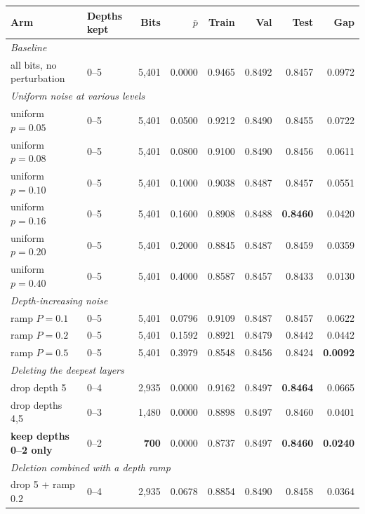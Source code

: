 \documentclass[11pt,a4paper]{article}
\begin{document}
\begin{table}[h]\centering\footnotesize
\begin{tabular}{llrrrrrr}
\toprule
\textbf{Arm} & \textbf{Depths kept} & \textbf{Bits} & $\bar p$ &
\textbf{Train} & \textbf{Val} & \textbf{Test} & \textbf{Gap}\\
\midrule
\multicolumn{8}{l}{\textit{Baseline}}\\
all bits, no perturbation & 0--5 & 5{,}401 & 0.0000 & 0.9465 & 0.8492 & 0.8457 & 0.0972\\
\midrule
\multicolumn{8}{l}{\textit{Uniform noise at various levels}}\\
uniform $p=0.05$ & 0--5 & 5{,}401 & 0.0500 & 0.9212 & 0.8490 & 0.8455 & 0.0722\\
uniform $p=0.08$ & 0--5 & 5{,}401 & 0.0800 & 0.9100 & 0.8490 & 0.8456 & 0.0611\\
uniform $p=0.10$ & 0--5 & 5{,}401 & 0.1000 & 0.9038 & 0.8487 & 0.8457 & 0.0551\\
uniform $p=0.16$ & 0--5 & 5{,}401 & 0.1600 & 0.8908 & 0.8488 & \textbf{0.8460} & 0.0420\\
uniform $p=0.20$ & 0--5 & 5{,}401 & 0.2000 & 0.8845 & 0.8487 & 0.8459 & 0.0359\\
uniform $p=0.40$ & 0--5 & 5{,}401 & 0.4000 & 0.8587 & 0.8457 & \textcolor{bad}{0.8433} & 0.0130\\
\midrule
\multicolumn{8}{l}{\textit{Depth-increasing noise}}\\
ramp $P=0.1$ & 0--5 & 5{,}401 & 0.0796 & 0.9109 & 0.8487 & 0.8457 & 0.0622\\
ramp $P=0.2$ & 0--5 & 5{,}401 & 0.1592 & 0.8921 & 0.8479 & \textcolor{bad}{0.8442} & 0.0442\\
ramp $P=0.5$ & 0--5 & 5{,}401 & 0.3979 & 0.8548 & 0.8456 & \textcolor{bad}{0.8424} & \textbf{0.0092}\\
\midrule
\multicolumn{8}{l}{\textit{Deleting the deepest layers}}\\
drop depth 5 & 0--4 & 2{,}935 & 0.0000 & 0.9162 & 0.8497 & \textbf{0.8464} & 0.0665\\
drop depths 4,5 & 0--3 & 1{,}480 & 0.0000 & 0.8898 & 0.8497 & 0.8460 & 0.0401\\
\textbf{keep depths 0--2 only} & 0--2 & \textbf{700} & 0.0000 & 0.8737 & 0.8497 & \textbf{0.8460} & \textbf{0.0240}\\
\midrule
\multicolumn{8}{l}{\textit{Deletion combined with a depth ramp}}\\
drop 5 + ramp $0.2$ & 0--4 & 2{,}935 & 0.0678 & 0.8854 & 0.8490 & 0.8458 & 0.0364\\

\end{tabular}
\end{table}
\end{document}
